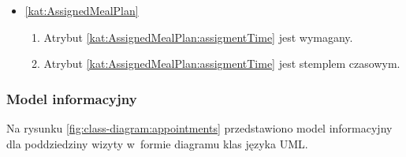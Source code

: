 \begin{itemize}[label={\textbf{Ograniczenia dla}}, wide, labelwidth=!, labelindent=0pt]
%

    \item\ref{kat:AssignedMealPlan}\mynobreakpar
    \begin{enumerate}[label={\textbf{OGR/5/\protect\twodigits{\arabic{enumi}}}}, wide, labelwidth=!, align=left, leftmargin=3cm, resume]
        \item Atrybut \ref{kat:AssignedMealPlan:assigmentTime} jest wymagany.

        \item Atrybut \ref{kat:AssignedMealPlan:assigmentTime} jest stemplem czasowym.
    \end{enumerate}
\end{itemize}

\subsubsection{Model informacyjny}\label{subsubsec:database:appointments:domainModel}

Na rysunku \ref{fig:class-diagram:appointments} przedstawiono model informacyjny dla poddziedziny wizyty w~formie diagramu klas języka UML.


\thispagestyle{normal}

